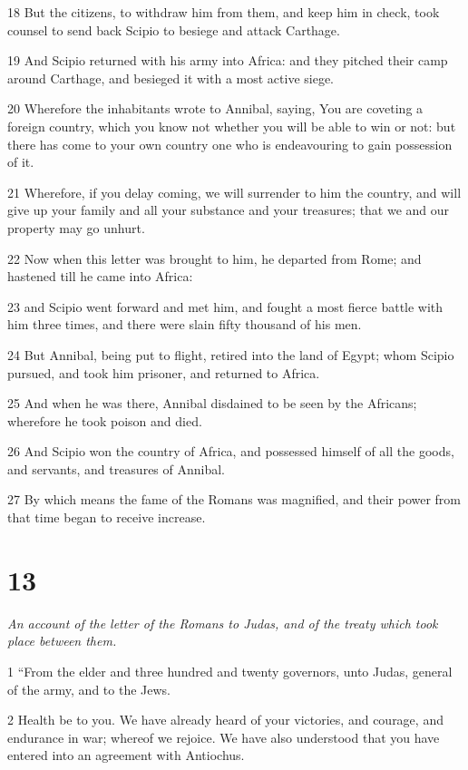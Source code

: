 18 But the citizens, to withdraw him from them, and keep him in check, took counsel to send back Scipio to besiege and attack Carthage. 

19 And Scipio returned with his army into Africa: and they pitched their camp around Carthage, and besieged it with a most active siege. 

20 Wherefore the inhabitants wrote to Annibal, saying, You are coveting a foreign country, which you know not whether you will be able to win or not: but there has come to your own country one who is endeavouring to gain possession of it. 

21 Wherefore, if you delay coming, we will surrender to him the country, and will give up your family and all your substance and your treasures; that we and our property may go unhurt. 

22 Now when this letter was brought to him, he departed from Rome; and hastened till he came into Africa: 

23 and Scipio went forward and met him, and fought a most fierce battle with him three times, and there were slain fifty thousand of his men. 

24 But Annibal, being put to flight, retired into the land of Egypt; whom Scipio pursued, and took him prisoner, and returned to Africa. 

25 And when he was there, Annibal disdained to be seen by the Africans; wherefore he took poison and died. 

26 And Scipio won the country of Africa, and possessed himself of all the goods, and servants, and treasures of Annibal. 

27 By which means the fame of the Romans was magnified, and their power from that time began to receive increase. 

\chapter{13}

\par \textit{An account of the letter of the Romans to Judas, and of the treaty which took place between them.}

1 “From the elder and three hundred and twenty governors, unto Judas, general of the army, and to the Jews. 

2 Health be to you. We have already heard of your victories, and courage, and endurance in war; whereof we rejoice. We have also understood that you have entered into an agreement with Antiochus. 

